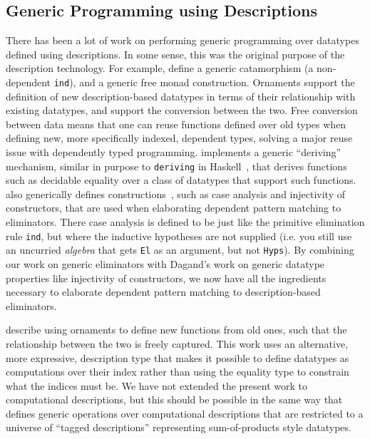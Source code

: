 \documentclass[preprint,nonatbib]{sigplanconf}
\begin{document}
\subsection{Generic Programming using Descriptions}

There has been a lot of work on performing generic programming over
datatypes defined using descriptions. In some sense, this was the original
purpose of the description technology. For example,
\citet{Chapman:2010:GAL:1932681.1863547} define a generic catamorphism
(a non-dependent {\tt ind}), and a generic free monad construction.
Ornaments \citep{mcbride2010ornamental} support the definition of new
description-based datatypes in terms of their relationship with
existing datatypes, and support the conversion between the two. Free
conversion between data means that one can reuse functions defined
over old types when defining new, more specifically indexed, dependent
types, solving a major reuse issue with dependently typed programming.
\citet{dagand:phd} implements a generic ``deriving'' mechanism,
similar in purpose to {\tt deriving} in
{\sc Haskell}~\citep{jones2003haskell}, that derives
functions such as decidable equality over a class of datatypes that
support such functions. \citet{dagand:phd} also generically defines
constructions~\citep{mcbride2006few}, such as case
analysis and injectivity of constructors, that are used when
elaborating dependent pattern matching to eliminators. There
case analysis is defined to be just like the primitive elimination
rule {\tt ind}, but where the inductive hypotheses are not supplied
(i.e. you still use an uncurried {\it algebra} that gets {\tt El} as
an argument, but not {\tt Hyps}). By combining our work on generic
eliminators with Dagand's work on generic datatype properties like
injectivity of constructors, we now have all the ingredients necessary to
elaborate dependent pattern matching to description-based eliminators.

\citet{dagand2012transporting} describe using ornaments
to define new functions from old ones, such that the
relationship between the two is freely captured.
This work uses an alternative, more expressive, description
type that makes it possible to define datatypes as computations over
their index rather than using the equality type to constrain what the
indices must be. We have not extended the present work to
computational descriptions, but this should be possible in the same
way that \citet{dagand:phd} defines generic operations over
computational descriptions that are restricted to a universe of
``tagged descriptions'' representing sum-of-products style datatypes.
\end{document}

